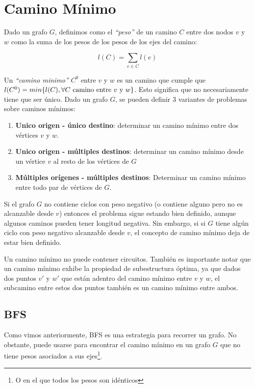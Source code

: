 \newpage
\section{Camino M\'inimo}

Dado un grafo $G$, definimos como el \emph{``peso''} de un camino $C$ entre dos nodos $v$ y $w$ como la suma de los pesos de los pesos de los ejes del camino:

\begin{equation}
l(C) = \sum_{e \in C} l(e)
\end{equation}

Un \emph{``camino minimo''} $C^0$ entre $v$ y $w$ es un camino que cumple que $l(C^0) = min \{ l(C), \forall \textrm{$ C$ camino entre $v$ y $w$}  \}$. Esto significa que no necesariamente tiene que ser \'unico. Dado un grafo $G$, se pueden definir 3 variantes de problemas sobre caminos m\'inimos:

\begin{enumerate}
\item \textbf{Unico origen - \'unico destino}: determinar un camino m\'inimo entre dos v\'ertices $v$ y $w$.
\item \textbf{Unico origen - m\'ultiples destinos}: determinar un camino m\'inimo desde un v\'ertice $v$ al resto de los v\'ertices de $G$
\item \textbf{M\'ultiples or\'igenes - m\'ultiples destinos}: Determinar un camino m\'inimo entre todo par de v\'ertices de $G$.
\end{enumerate}

Si el grafo $G$ no contiene ciclos con peso negativo (o contiene alguno pero no es alcanzable desde $v$) entonces el problema sigue estando bien definido, aunque algunos caminos pueden tener longitud negativa. Sin embargo, si si $G$ tiene alg\'un ciclo con peso negativo alcanzable desde $v$, el concepto de camino m\'inimo deja de estar bien definido.

Un camino m\'inimo no puede contener circuitos. Tambi\'en es importante notar que un camino m\'inimo exhibe la propiedad de subestructura \'optima, ya que dados dos puntos $v'$ y $w'$ que est\'an adentro del camino m\'inimo entre $v$ y $w$, el subcamino entre estos dos puntos tambi\'en es un camino m\'inimo entre ambos.

\subsection{BFS}

Como vimos anteriormente, BFS es una estrategia para recorrer un grafo. No obstante, puede usarse para encontrar el camino m\'inimo en un grafo $G$ que no tiene pesos asociados a sus ejes\footnote{O en el que todos los pesos son id\'enticos}.

